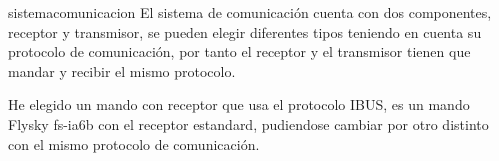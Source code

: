 
sistemacomunicacion
                El sistema de comunicación cuenta con dos componentes, receptor y transmisor, se pueden elegir diferentes tipos teniendo en cuenta su protocolo de comunicación, por tanto el receptor y el transmisor tienen que mandar y recibir el mismo protocolo.
                
                He elegido un mando con receptor que usa el protocolo IBUS, es un mando Flysky fs-ia6b con el receptor estandard, pudiendose cambiar por otro distinto con el mismo protocolo de comunicación.